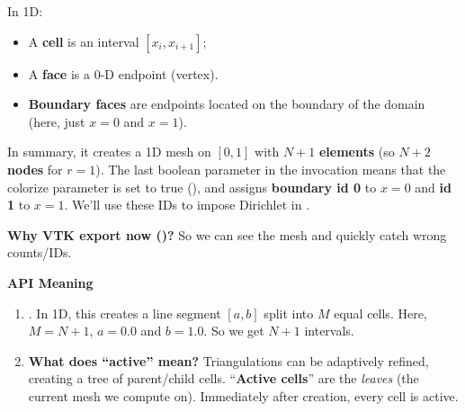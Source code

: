 \begin{enumerate}
\begin{itemize}
        In 1D:
        \begin{itemize}
            \item A \textbf{cell} is an interval $\left[x_{i}, x_{i+1}\right]$;
            \item A \textbf{face} is a 0-D endpoint (vertex).
            \item \textbf{Boundary faces} are endpoints located on the boundary of the domain (here, just $x=0$ and $x=1$).
        \end{itemize}
    \end{itemize}
    In summary, it creates a 1D mesh on $\left[0,1\right]$ with $N + 1$ \textbf{elements} (so $N+2$ \textbf{nodes} for $r=1$). The last boolean parameter in the  invocation means that the colorize parameter is set to true (), and assigns \textbf{boundary id 0} to $x=0$ and \textbf{id 1} to $x=1$. We'll use these IDs to impose Dirichlet in .

    \textcolor{Green3}{ \textbf{Why VTK export now ()?}} So we can see the mesh and quickly catch wrong counts/IDs.

    \textcolor{Green3}{ \textbf{API Meaning}}
    \begin{enumerate}
        \item {}. In 1D, this creates a line segment $\left[a,b\right]$ split into $M$ equal cells. Here, $M = N + 1$, $a = 0.0$ and $b=1.0$. So we get $N+1$ intervals.
        
        \item \textbf{What does ``active'' mean?} Triangulations can be adaptively refined, creating a tree of parent/child cells. ``\textbf{Active cells}'' are the \emph{leaves} (the current mesh we compute on). Immediately after creation, every cell is active.
        

\end{enumerate}
\end{enumerate}
